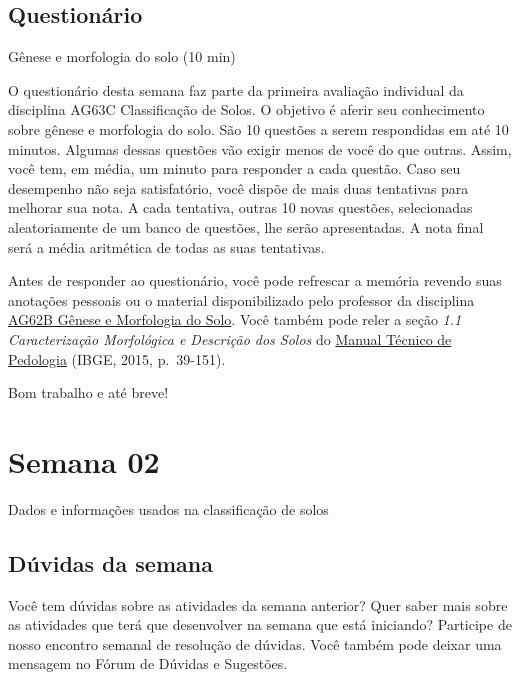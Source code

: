 \documentclass[
  11pt,
  a4paper,
  dvipsnames]{tufte-book}
\begin{document}
\hypertarget{questionuxe1rio}{%
\section{Questionário}\label{questionuxe1rio}}

Gênese e morfologia do solo (10 min)

O questionário desta semana faz parte da primeira avaliação individual da disciplina AG63C Classificação de Solos. O objetivo é aferir seu conhecimento sobre gênese e morfologia do solo. São 10 questões a serem respondidas em até 10 minutos. Algumas dessas questões vão exigir menos de você do que outras. Assim, você tem, em média, um minuto para responder a cada questão. Caso seu desempenho não seja satisfatório, você dispõe de mais duas tentativas para melhorar sua nota. A cada tentativa, outras 10 novas questões, selecionadas aleatoriamente de um banco de questões, lhe serão apresentadas. A nota final será a média aritmética de todas as suas tentativas.

Antes de responder ao questionário, você pode refrescar a memória revendo suas anotações pessoais ou o material disponibilizado pelo professor da disciplina \href{http://portal.utfpr.edu.br/cursos/coordenacoes/graduacao/santa-helena/sh-agronomia/matriz-e-docentes}{AG62B Gênese e Morfologia do Solo}. Você também pode reler a seção \emph{1.1 Caracterização Morfológica e Descrição dos Solos} do \href{https://biblioteca.ibge.gov.br/visualizacao/livros/liv95017.pdf}{Manual Técnico de Pedologia} (IBGE, 2015, p.~39-151).

Bom trabalho e até breve!

\hypertarget{semana-02}{%
\chapter{Semana 02}\label{semana-02}}

Dados e informações usados na classificação de solos

\hypertarget{duxfavidas-da-semana}{%
\section{Dúvidas da semana}\label{duxfavidas-da-semana}}

Você tem dúvidas sobre as atividades da semana anterior? Quer saber mais sobre as atividades que terá que desenvolver na semana que está iniciando? Participe de nosso encontro semanal de resolução de dúvidas. Você também pode deixar uma mensagem no Fórum de Dúvidas e Sugestões.
\end{document}

